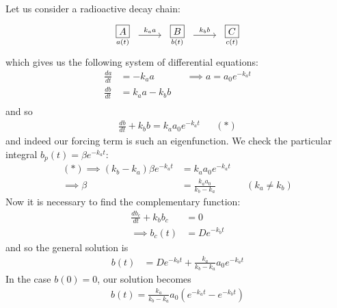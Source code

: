 \documentclass{../template/note}
\begin{document}
    \begin{example}
        Let us consider a radioactive decay chain:
        \[\begin{tikzcd}[ampersand replacement=\&]
            \begin{array}{c} \substack{\boxed A \\ a(t)} \end{array} \& \begin{array}{c} \substack{\boxed B \\ b(t)} \end{array} \& \begin{array}{c} \substack{\boxed C \\ c(t)} \end{array}
            \arrow["{k_aa}", from=1-1, to=1-2]
            \arrow["{k_bb}", from=1-2, to=1-3]
        \end{tikzcd}\]
        which gives us the following system of differential equations:
        \begin{align*}
            \frac{da}{dt} &= -k_aa && \implies a=a_0e^{-k_at}\\
            \frac{db}{dt} &= k_aa - k_bb \\
        \end{align*}
        and so
        \begin{align*}
            \frac{db}{dt} + k_bb = k_aa_0e^{-k_at} && (*)
        \end{align*}
        and indeed our forcing term is such an eigenfunction. We check the particular integral \(b_p(t) = \beta e^{-k_a t}\):
        \begin{align*}
            (*) \implies (k_b-k_a)\beta e^{-k_at} &= k_aa_0e^{-k_at} \\
            \implies \beta &= \frac{k_aa_0}{k_b-k_a} && (k_a \neq k_b)
        \end{align*}
        Now it is necessary to find the complementary function:
        \begin{align*}
            \frac{db_c}{dt} + k_bb_c &= 0 \\
            \implies b_c(t) &= De^{-k_bt}
        \end{align*}
        and so the general solution is
        \begin{align*}
            b(t) &= De^{-k_bt} + \frac{k_a}{k_b-k_a}a_0 e^{-k_at}
        \end{align*}
        In the case \(b(0) = 0\), our solution becomes
        \begin{align*}
            b(t) = \frac{k_a}{k_b-k_a}a_0(e^{-k_at}-e^{-k_bt})
        \end{align*}
    \end{example}
    
\end{document}
